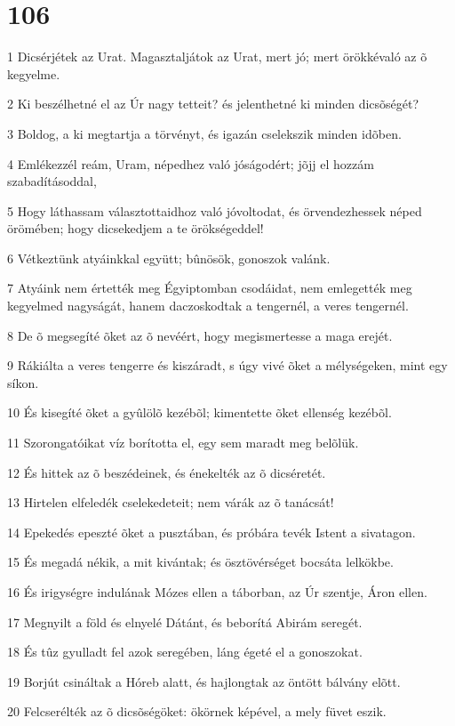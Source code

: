 \chapter{106}

\par 1 Dicsérjétek az Urat. Magasztaljátok az Urat, mert jó; mert örökkévaló az õ kegyelme.
\par 2 Ki beszélhetné el az Úr nagy tetteit? és jelenthetné ki minden dicsõségét?
\par 3 Boldog, a ki megtartja a törvényt, és igazán cselekszik minden idõben.
\par 4 Emlékezzél reám, Uram, népedhez való jóságodért; jõjj el hozzám szabadításoddal,
\par 5 Hogy láthassam választottaidhoz való jóvoltodat, és örvendezhessek néped örömében; hogy dicsekedjem a te örökségeddel!
\par 6 Vétkeztünk atyáinkkal együtt; bûnösök, gonoszok valánk.
\par 7 Atyáink nem értették meg Égyiptomban csodáidat, nem emlegették meg kegyelmed nagyságát, hanem daczoskodtak a tengernél, a veres tengernél.
\par 8 De õ megsegíté õket az õ nevéért, hogy megismertesse a maga erejét.
\par 9 Rákiálta a veres tengerre és kiszáradt, s úgy vivé õket a mélységeken, mint egy síkon.
\par 10 És kisegíté õket a gyûlölõ kezébõl; kimentette õket ellenség kezébõl.
\par 11 Szorongatóikat víz borította el, egy sem maradt meg belõlük.
\par 12 És hittek az õ beszédeinek, és énekelték az õ dicséretét.
\par 13 Hirtelen elfeledék cselekedeteit; nem várák az õ tanácsát!
\par 14 Epekedés epeszté õket a pusztában, és próbára tevék Istent a sivatagon.
\par 15 És megadá nékik, a mit kivántak; és ösztövérséget bocsáta lelkökbe.
\par 16 És irigységre indulának Mózes ellen a táborban, az Úr szentje, Áron ellen.
\par 17 Megnyilt a föld és elnyelé Dátánt, és beborítá Abirám seregét.
\par 18 És tûz gyulladt fel azok seregében, láng égeté el a gonoszokat.
\par 19 Borjút csináltak a Hóreb alatt, és hajlongtak az öntött bálvány elõtt.
\par 20 Felcserélték az õ dicsõségöket: ökörnek képével, a mely füvet eszik.
